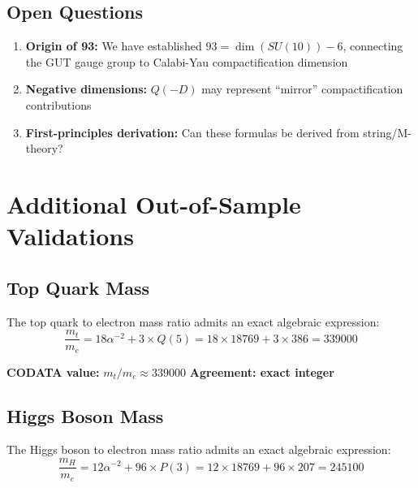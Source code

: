 \documentclass[11pt,a4paper]{article}
\begin{document}
\subsection{Open Questions}

\begin{enumerate}
    \item \textbf{Origin of 93:} We have established $93 = \dim(SU(10)) - 6$, connecting the GUT gauge group to Calabi-Yau compactification dimension
    \item \textbf{Negative dimensions:} $Q(-D)$ may represent ``mirror'' compactification contributions
    \item \textbf{First-principles derivation:} Can these formulas be derived from string/M-theory?
\end{enumerate}

\section{Additional Out-of-Sample Validations}

\subsection{Top Quark Mass}

\begin{theorem}
The top quark to electron mass ratio admits an exact algebraic expression:
\begin{equation}
\boxed{\frac{m_t}{m_e} = 18\alpha^{-2} + 3 \times Q(5) = 18 \times 18769 + 3 \times 386 = 339000}
\end{equation}
\end{theorem}

\textbf{CODATA value:} $m_t/m_e \approx 339000$ \quad \textbf{Agreement: exact integer}

\subsection{Higgs Boson Mass}

\begin{theorem}
The Higgs boson to electron mass ratio admits an exact algebraic expression:
\begin{equation}
\boxed{\frac{m_H}{m_e} = 12\alpha^{-2} + 96 \times P(3) = 12 \times 18769 + 96 \times 207 = 245100}
\end{equation}
\end{theorem}
\end{document}
